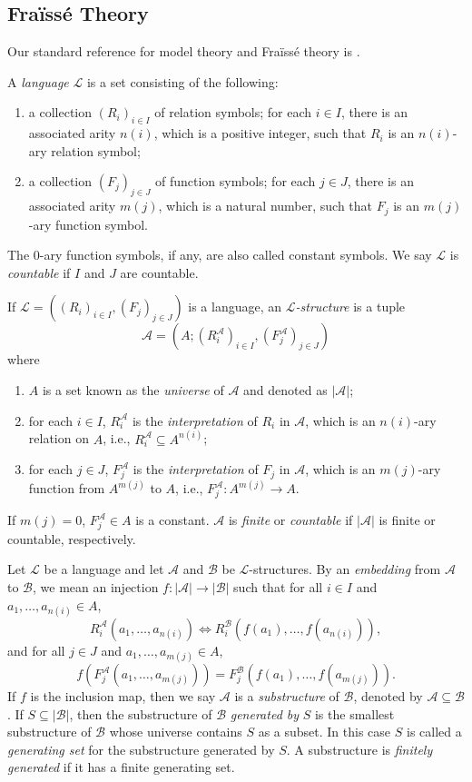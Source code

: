 \documentclass{amsart}
\theoremstyle{definition}
\theoremstyle{remark}
\begin{document}
\subsection{Fra\"iss\'e Theory} Our standard reference for model theory and Fra\"iss\'e theory is \cite{Hodges}.

A {\em language} $\mathcal{L}$ is a set consisting of the following:
\begin{enumerate}
\item[(a)] a collection $(R_i)_{i\in I}$ of relation symbols; for each $i \in I$, there is an associated arity $n(i)$, which is a positive integer, such that $R_i$ is an $n(i)$-ary relation symbol;
\item[(b)] a collection $(F_j)_{j\in J}$ of function symbols; for each $j \in J$, there is an associated arity $m(j)$, which is a natural number, such that $F_j$ is an $m(j)$-ary function symbol.
\end{enumerate}
The $0$-ary function symbols, if any, are also called constant symbols. We say $\mathcal{L}$ is {\em countable} if $I$ and $J$ are countable.

If $\mathcal{L}=((R_i)_{i\in I}, (F_j)_{j\in J})$ is a language, an {\em $\mathcal{L}$-structure} is a tuple
$$\mathcal{A}= (A; (R_i^{\mathcal{A}})_{i\in I}, (F_j^{\mathcal{A}})_{j \in J} )$$ where 
\begin{enumerate}
\item[(i)] $A$ is a set known as the {\em universe} of $\mathcal{A}$ and denoted as $|\mathcal{A}|$;
\item[(ii)] for each $i\in I$, $R_i^{\mathcal{A}}$ is the {\em interpretation} of $R_i$ in $\mathcal{A}$, which is an $n(i)$-ary relation on $A$, i.e., $R_i^{\mathcal{A}}\subseteq A^{n(i)}$;
\item[(iii)] for each $j\in J$, $F_j^{\mathcal{A}}$ is the {\em interpretation} of $F_j$ in $\mathcal{A}$, which is an $m(j)$-ary function from $A^{m(j)}$ to $A$, i.e., $F_j^{\mathcal{A}}\colon A^{m(j)}\to A$.
\end{enumerate}
If $m(j)=0$, $F_j^{\mathcal{A}}\in A$ is a constant. $\mathcal{A}$ is {\em finite} or {\em countable} if $|\mathcal{A}|$ is finite or countable, respectively.

Let $\mathcal{L}$ be a language and let $\mathcal{A}$ and $\mathcal{B}$ be $\mathcal{L}$-structures. By an {\em embedding} from $\mathcal{A}$ to $\mathcal{B}$, we mean an injection $f\colon |\mathcal{A}| \rightarrow |\mathcal{B}|$ such that for all $i \in I$ and $a_1,\dots,a_{n(i)} \in A$,
$$ R_i^{\mathcal{A}}(a_1,\dots,a_{n(i)}) \iff  R_i^{\mathcal{B}}(f(a_1),\dots,f(a_{n(i)})),$$
 and for all $j\in J$ and $a_1,\dots,a_{m(j)} \in A$,
$$ f(F_j^{\mathcal{A}}(a_1,\dots,a_{m(j)}))=F_j^{\mathcal{B}}(f(a_1),\dots,f(a_{m(j)})).$$ 
If $f$ is the inclusion map, then we say $\mathcal{A}$ is a {\em substructure} of $\mathcal{B}$, denoted by $\mathcal{A}\subseteq \mathcal{B}$. If $S\subseteq |\mathcal{B}|$, then the substructure of $\mathcal{B}$ {\em generated by} $S$ is the smallest substructure of $\mathcal{B}$ whose universe contains $S$ as a subset. In this case $S$ is called a {\em generating set} for the substructure generated by $S$. A substructure is {\em finitely generated} if it has a finite generating set.  
\end{document}
